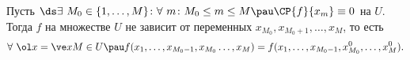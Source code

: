 
Пусть $\ds\exists\ M_0\in\{1,\ldots,M\}\colon \forall\ m\colon M_0\le m\le M\pau \CP{f}{x_m}\equiv 0$ на $U$. Тогда $f$ на множестве $U$ не зависит от переменных $x_{M_0},x_{M_0+1},\ldots,x_M$, то есть
\[\forall\ \ol x = \ve xM\in U\pau f(x_1,\ldots,x_{M_0-1},x_{M_0}\ldots,x_M)=f(x_1,\ldots,x_{M_0-1},x_{M_0}^0,\ldots,x_M^0).\]
